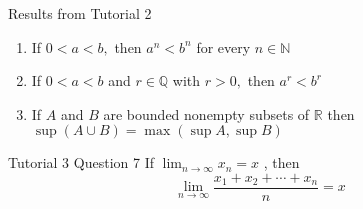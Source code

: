 \documentclass[10pt,landscape]{article}
\theoremstyle{definition}
\newcommand{\thistheoremname}{}
\newtheorem*{genericthm*}{\thistheoremname}
\newenvironment{namedthm*}[1]
{\renewcommand{\thistheoremname}{#1}\begin{genericthm*}}
{\end{genericthm*}}
\begin{document}
\begin{multicols}{3}
\begin{namedthm*}{Results from Tutorial 2}~
\begin{enumerate}
    \item If $0<a<b,$ then $a^{n}<b^{n}$ for every $n \in \mathbb{N}$
    \item If $0<a<b$ and $r \in \mathbb{Q}$ with $r>0,$ then $a^{r}<b^{r}$
    \item If $A$ and $B$ are bounded nonempty subsets of $\mathbb{R}$ then $\sup (A \cup B)=\max (\sup A, \sup B)$
\end{enumerate}
\end{namedthm*}

\begin{namedthm*}{Tutorial 3 Question 7} 
If $\lim _{n \rightarrow \infty} x_{n}=x$ , then
\[
\lim _{n \rightarrow \infty} \frac{x_{1}+x_{2}+\cdots+x_{n}}{n}=x
\]
\end{namedthm*}



\end{multicols}
\end{document}
